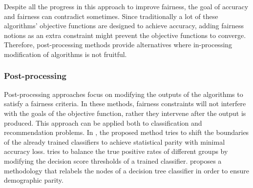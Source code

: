 Despite all the progress in this approach to improve fairness, the goal of accuracy and fairness can contradict sometimes. Since traditionally a lot of these algorithms' objective functions are designed to achieve accuracy, adding fairness notions as an extra constraint might prevent the objective functions to converge. Therefore, post-processing methods provide alternatives where in-processing modification of algorithms is not fruitful.


\subsubsection{Post-processing}
Post-processing approaches focus on modifying the outputs of the algorithms to satisfy a fairness criteria. In these methods, fairness constraints will not interfere with the goals of the objective function, rather they intervene after the output is produced. This approach can be applied both to classification and recommendation problems.
In \cite{fish2016confidence}, the proposed method tries to shift the boundaries of the already trained classifiers to achieve statistical parity with minimal accuracy loss. \cite{hardt2016equality} tries to balance the true positive rates of different groups by modifying the decision score thresholds of a trained classifier. \cite{kamiran2010discrimination} proposes a methodology that relabels the nodes of a decision tree classifier in order to ensure demographic parity.

